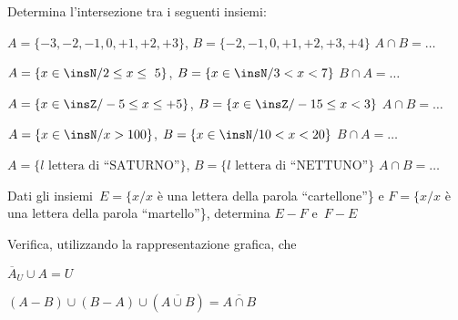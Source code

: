 \begin{esercizio}
 \label{ese:7.13}
 Determina l'intersezione tra i seguenti insiemi:
\begin{enumeratea}
 \item $A=\{-3, -2, -1, 0, +1, +2, +3\}$, $B=\{-2,-1, 0, +1, +2, +3, +4\}$ 
$A\cap B=\ldots$
 \item $A=\{x\in\insN/2\le x\le~5\}$, $B=\{x\in\insN/3<x<7\}$ $B\cap A=\ldots$
 \item $A=\{x\in\insZ/-5\le x\le+5\}$, $B=\{x\in\insZ/-15\le x<3\}$ $A\cap 
B=\ldots$
 \item $A=\{x\in\insN/x>100\}$, $B=\{x\in\insN/10<x<20\}$ $B\cap A=\ldots$
 \item $A=\{l\text{ lettera di ``SATURNO''}\}$, $B=\{l\text{ lettera di 
``NETTUNO''}\}$ $A\cap B=\ldots$
\end{enumeratea}
\end{esercizio}


\begin{esercizio}
\label{ese:7.14}
Dati gli insiemi~$E=\{x / x$ è una lettera della parola ``cartellone''\} e
$F=\{x / x$ è una lettera della parola ``martello''\}, determina
$E-F$ e~$F-E$
\end{esercizio}


\begin{esercizio}
\label{ese:7.15}
Verifica, utilizzando la rappresentazione grafica, che
 \begin{enumeratea}
 \item $\overline{A}_{U}\cup A=U$
 \item $(A-B)\cup (B-A)\cup (\overline{A\cup B})=\overline{{A\cap B}}$
 \end{enumeratea}
\end{esercizio}

